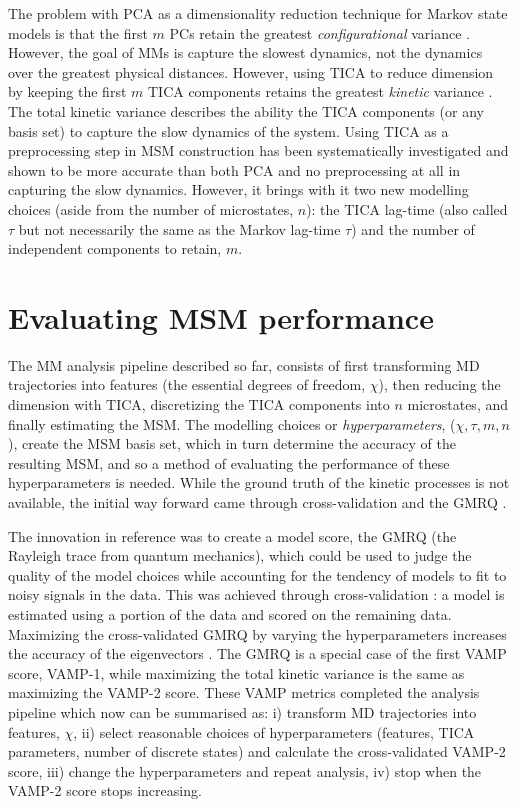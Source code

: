 The problem with PCA as a dimensionality reduction technique for Markov state models is that the first $m$ PCs retain the greatest \emph{configurational} variance \cite{friedman2001elements}. However, the goal of MMs is capture the slowest dynamics, not the dynamics over the greatest physical distances. However, using TICA to reduce dimension by keeping the first $m$ TICA components retains the greatest \emph{kinetic} variance \cite{noeKineticDistanceKinetic2015}. The total kinetic variance describes the ability  the TICA components (or any basis set) to capture the slow dynamics of the system. Using TICA as a preprocessing step in MSM construction has been systematically investigated and shown to be more accurate than both PCA and no preprocessing at all \cite{husicOptimizedParameterSelection2016} in capturing the slow dynamics. However, it brings with it two new modelling choices (aside from the number of microstates, $n$): the TICA lag-time (also called $\tau$ but not necessarily the same as the Markov lag-time $\tau$) and the number of independent components to retain, $m$.  

\section{Evaluating MSM performance}\label{sec:intro_msm_perf}
The MM analysis pipeline described so far, consists of first transforming MD trajectories into features (the essential degrees of freedom, $\chi$), then reducing the dimension with TICA,  discretizing the TICA components into $n$ microstates, and finally estimating the MSM. The modelling choices or \emph{hyperparameters}, ($\chi, \tau, m, n$), create the MSM basis set, which in turn determine the accuracy of the resulting MSM, and so a method of evaluating the performance of these hyperparameters  is needed. While the ground truth of the kinetic processes is not available, the initial way forward came through cross-validation and the GMRQ \cite{mcgibbonVariationalCrossvalidationSlow2015}. 

The innovation in reference \cite{mcgibbonVariationalCrossvalidationSlow2015} was to create a model score, the GMRQ (the Rayleigh trace from quantum mechanics), which could be used to judge the quality of the model choices while accounting for the tendency of models to fit to noisy signals in the data. This was achieved through cross-validation \cite{arlotSurveyCrossvalidationProcedures2009}: a model is estimated using a portion of the data and scored on the remaining data. Maximizing the cross-validated GMRQ by varying the hyperparameters increases the accuracy of the eigenvectors \cite{mcgibbonVariationalCrossvalidationSlow2015}. The GMRQ is a special case of the first VAMP score, VAMP-1, while maximizing the total kinetic variance is the same as maximizing the VAMP-2 score. These VAMP metrics completed the analysis pipeline \cite{schererVariationalSelectionFeatures2019} which now can be summarised as: i) transform MD trajectories into features, $\chi$, ii) select reasonable choices of  hyperparameters (features, TICA parameters, number of discrete states) and calculate the cross-validated VAMP-2 score, iii) change the hyperparameters and repeat analysis, iv) stop when the VAMP-2 score stops increasing. 

